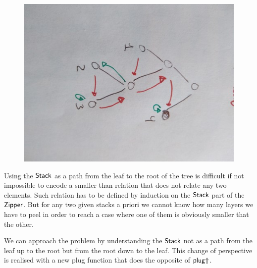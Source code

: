 \documentclass[sigplan,10pt,review]{acmart}
\newcommand{\AD}{\AgdaDatatype}
\newcommand{\AF}{\AgdaFunction}
\begin{document}
\begin{figure}[h]
  \includegraphics[scale=0.25, angle=90]{figure3}
\end{figure}

Using the \ensuremath{\AD{Stack}} as a path from the leaf to the root of the tree is
difficult if not impossible to encode a smaller than relation that
does not relate any two elements. Such relation has to be defined by
induction on the \ensuremath{\AD{Stack}} part of the \ensuremath{\AD{Zipper}}. But for any two given
stacks a priori we cannot know how many layers we have to peel in
order to reach a case where one of them is obviously smaller that the
other.

We can approach the problem by understanding the \ensuremath{\AD{Stack}} not as a path
from the leaf up to the root but from the root down to the leaf. This
change of perspective is realised with a new plug function that does
the opposite of \ensuremath{\AF{plug\ensuremath{\Uparrow}}}.
\end{document}
